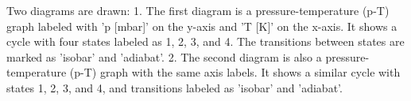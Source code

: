 Two diagrams are drawn:  
1. The first diagram is a pressure-temperature (p-T) graph labeled with 'p [mbar]' on the y-axis and 'T [K]' on the x-axis. It shows a cycle with four states labeled as 1, 2, 3, and 4. The transitions between states are marked as 'isobar' and 'adiabat'.  
2. The second diagram is also a pressure-temperature (p-T) graph with the same axis labels. It shows a similar cycle with states 1, 2, 3, and 4, and transitions labeled as 'isobar' and 'adiabat'.